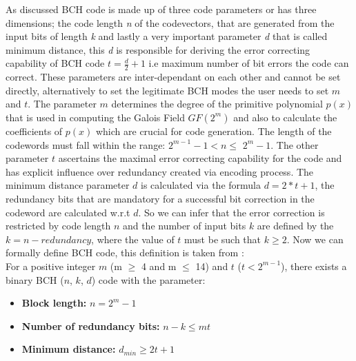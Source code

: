 As discussed BCH code is made up of three code parameters or has three dimensions; the code length \emph{n} of the codevectors, that are generated from the input bits of length \emph{k} and lastly a very important parameter \emph{d} that is called minimum distance, this \emph{d} is responsible for deriving the error correcting capability of BCH code $t = \frac{d}{2} + 1$ i.e maximum number of bit errors the code can correct. These parameters are inter-dependant on each other
and cannot be set directly, alternatively to set the legitimate BCH modes the user needs to set $m$ and $t$. The parameter $m$ determines the degree of the primitive polynomial $p(x)$ that is used in computing the Galois Field $GF(2^m)$ and also to calculate the coefficients of $p(x)$ which are crucial for code generation. The length of the codewords must fall within the range: $2^{m-1} - 1 < n \leq$ $2^m - 1$. The other parameter $t$ ascertains the maximal error correcting capability
for the code and has explicit influence over redundancy created via encoding process. The minimum distance parameter $d$ is calculated via the formula $d = 2 * t + 1$, the redundancy bits that are mandatory for a successful bit correction in the codeword are calculated w.r.t $d$. So we can infer that the error correction is restricted by code length $n$ and the number of input bits $k$ are defined by the $k = n - redundancy$, where the value of $t$ must be such that $k \geq 2$. Now we can
formally define BCH code, this definition is taken from \cite{66}:\\

For a positive integer $m$ (m $\geq$ 4 and m $\leq$ 14) and $t$ ($t < 2^{m-1}$), there exists a binary BCH ($n$, $k$, $d$) code with the parameter:
\begin{itemize}
\item \textbf{Block length:} $n = 2^m - 1$
\item \textbf{Number of redundancy bits:} $n - k \leq mt$
\item \textbf{Minimum distance:} $d_{min} \geq 2t + 1$
\end{itemize}

